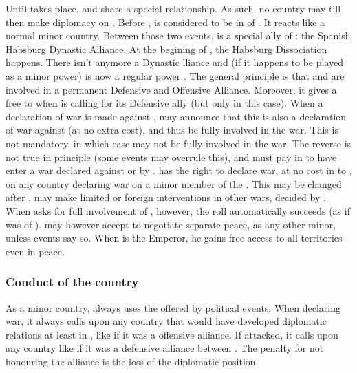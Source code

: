 \aparag Until  takes place, \SPA and 
share a special relationship. As such, no country may till then make
diplomacy on .
\bparag Before , \HAB is considered to be
in \EW of \SPA. It reacts like a normal minor country.
\bparag Between those two events,  is a special ally of
\SPA: the Spanish Habsburg Dynastic Alliance.
\bparag At the begining of , the Habsburg Dissociation
happens.  There isn't anymore a Dynastic lliance and (if
it happens to be played as a minor power) is now a regular power .
The general principle is that \SPA and  are
involved in a permanent Defensive and Offensive Alliance. Moreover, it
gives a free \CB to \SPA when  is calling for its
Defensive ally (but only in this case).
\bparag When a declaration of war is made against , \SPA may
announce that this is also a declaration of war against \SPA (at no
extra cost), and thus be fully involved in the war. This is not
mandatory, in which case \SPA may not be fully involved in the war.
\bparag The reverse is not true in principle (some events may overrule
this), and \SPA must pay in \STAB to have  enter a war
declared against or by \SPA.
\bparag {} has the right to declare war, at no cost in \STAB to
\SPA, on any country declaring war on a minor member of the \HRE.
This may be changed after .
\bparag {} may make limited or foreign interventions in
other wars, decided by \SPA.
\bparag When \SPA asks for full involvement of ,
however, the roll automatically succeeds (as if  was
\VASSAL of \SPA).
  may however accept to negotiate
separate peace, as any other minor, unless events say so.
When \SPA is the Emperor, he gains free access to all 
territories even in peace.

\subsubsection{Conduct of the \hab country}
\aparag As a minor country,  always uses the \CB offered by
political events. When declaring war, it always calls upon any country
that would have developed diplomatic relations at least in \EW, like if
it was a \MAJ offensive alliance. If attacked, it calls upon any country
like if it was a defensive alliance between \MAJ. The penalty for not
honouring the alliance is the loss of the diplomatic position.


